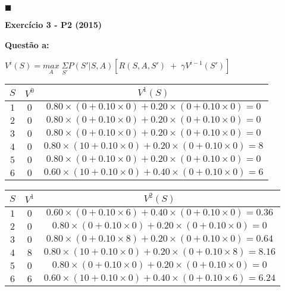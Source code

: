 \documentclass{article}
\begin{document}
\begin{flushright}
$\blacksquare$
\end{flushright}

\newpage
\textbf{\Large{Exercício 3 - P2 (2015)}}

\bigskip
\quad\large{\textbf{Questão a:}}

\begin{center}

$V^{i}(S) = \underset{A}{max} \; \underset{S'}{\Sigma}P(S'|S, A)[R(S, A, S') \; + \; \gamma V^{i-1}(S')]$

\end{center}
\begin{center}
\begin{tabular}{| c | c | c |}
	\hline
		$S$ & $V^{0}$ & $V^{1}(S)$ \\ \hline
		$1$ & $0$ & $0.80 \times (0+ 0.10 \times 0) + 0.20 \times (0 + 0.10 \times 0) = 0$ \\ \hline
		$2$ & $0$ & $0.80 \times (0 + 0.10 \times 0) + 0.20 \times (0 + 0.10 \times 0) = 0$ \\ \hline
		$3$ & $0$ & $0.80 \times (0 + 0.10 \times 0) + 0.20 \times (0 + 0.10 \times 0) = 0$ \\ \hline
		$4$ & $0$ & $0.80 \times (10 + 0.10 \times 0) + 0.20 \times (0 + 0.10 \times 0) = 8$ \\ \hline
		$5$ & $0$ & $0.80 \times (0 + 0.10 \times 0) + 0.20 \times (0 + 0.10 \times 0) = 0$ \\ \hline
		$6$ & $0$ & $0.60 \times (10 + 0.10 \times 0) + 0.40 \times (0 + 0.10 \times 0) = 6$ \\ \hline	
\end{tabular}

\bigskip
\begin{tabular}{| c | c | c |}
	\hline
		$S$ & $V^{1}$ & $V^{2}(S)$ \\ \hline
		$1$ & $0$ & $0.60 \times (0 + 0.10 \times 6) + 0.40 \times (0 + 0.10 \times 0) = 0.36$ \\ \hline
		$2$ & $0$ & $0.80 \times (0 + 0.10 \times 0) + 0.20 \times (0 + 0.10 \times 0) = 0$ \\ \hline
		$3$ & $0$ & $0.80 \times (0 + 0.10 \times 8) + 0.20 \times (0 + 0.10 \times 0) = 0.64$ \\ \hline
		$4$ & $8$ & $0.80 \times (10 + 0.10 \times 0) + 0.20 \times (0 + 0.10 \times 8) = 8.16$ \\ \hline
		$5$ & $0$ & $0.80 \times (0 + 0.10 \times 0) + 0.20 \times (0 + 0.10 \times 0) = 0$ \\ \hline
		$6$ & $6$ & $0.60 \times (10 + 0.10 \times 0) + 0.40 \times (0 + 0.10 \times 6) = 6.24$ \\ \hline
\end{tabular}


\end{center}
\end{document}
